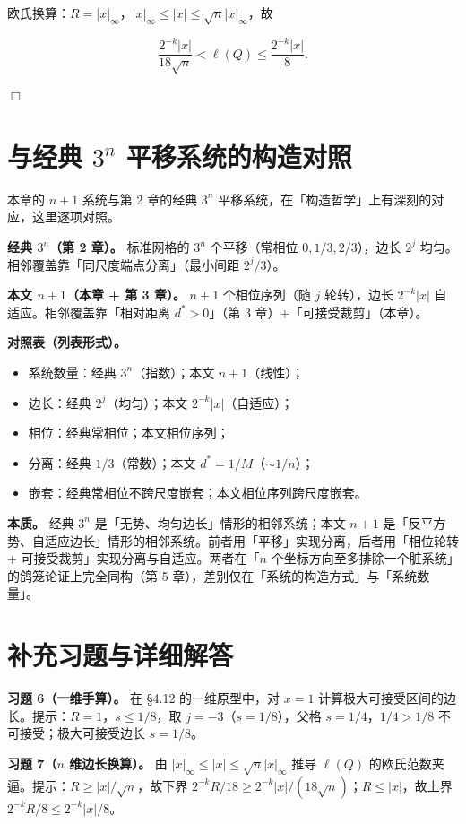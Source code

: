 \documentclass[a4paper,11pt,openany]{ctexbook}
\numberwithin{equation}{chapter}
\numberwithin{figure}{chapter}
\numberwithin{table}{chapter}
\begin{document}
欧氏换算：$R=|x|_\infty$，$|x|_\infty\le|x|\le\sqrt n|x|_\infty$，故

$$\frac{2^{-k}|x|}{18\sqrt n}<\ell(Q)\le\frac{2^{-k}|x|}{8}.$$

$\Box$

\section{与经典 $3^n$ 平移系统的构造对照}

本章的 $n+1$ 系统与第 2 章的经典 $3^n$ 平移系统，在「构造哲学」上有深刻的对应，这里逐项对照。

\textbf{经典 $3^n$（第 2 章）。} 标准网格的 $3^n$ 个平移（常相位 $0,1/3,2/3$），边长 $2^j$ 均匀。相邻覆盖靠「同尺度端点分离」（最小间距 $2^j/3$）。

\textbf{本文 $n+1$（本章 + 第 3 章）。} $n+1$ 个相位序列（随 $j$ 轮转），边长 $2^{-k}|x|$ 自适应。相邻覆盖靠「相对距离 $d^*>0$」（第 3 章）+「可接受裁剪」（本章）。

\textbf{对照表（列表形式）。}

\begin{itemize}
\item 系统数量：经典 $3^n$（指数）；本文 $n+1$（线性）；
\item 边长：经典 $2^j$（均匀）；本文 $2^{-k}|x|$（自适应）；
\item 相位：经典常相位；本文相位序列；
\item 分离：经典 $1/3$（常数）；本文 $d^*=1/M$（$\sim1/n$）；
\item 嵌套：经典常相位不跨尺度嵌套；本文相位序列跨尺度嵌套。
\end{itemize}

\textbf{本质。} 经典 $3^n$ 是「无势、均匀边长」情形的相邻系统；本文 $n+1$ 是「反平方势、自适应边长」情形的相邻系统。前者用「平移」实现分离，后者用「相位轮转 + 可接受裁剪」实现分离与自适应。两者在「$n$ 个坐标方向至多排除一个脏系统」的鸽笼论证上完全同构（第 5 章），差别仅在「系统的构造方式」与「系统数量」。

\section{补充习题与详细解答}

\textbf{习题 6（一维手算）。} 在 §4.12 的一维原型中，对 $x=1$ 计算极大可接受区间的边长。提示：$R=1$，$s\le1/8$，取 $j=-3$（$s=1/8$），父格 $s=1/4$，$1/4>1/8$ 不可接受；极大可接受边长 $s=1/8$。

\textbf{习题 7（$n$ 维边长换算）。} 由 $|x|_\infty\le|x|\le\sqrt n|x|_\infty$ 推导 $\ell(Q)$ 的欧氏范数夹逼。提示：$R\ge|x|/\sqrt n$，故下界 $2^{-k}R/18\ge2^{-k}|x|/(18\sqrt n)$；$R\le|x|$，故上界 $2^{-k}R/8\le2^{-k}|x|/8$。
\end{document}
